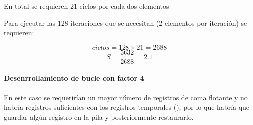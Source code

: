 En total se requieren 21 ciclos por cada dos elementos

Para ejecutar las 128 iteraciones que se necesitan (2 elementos por iteración)
se requieren:

\[
ciclos = 128 \times 21 = 2688
\]
\[
S = \frac{5632}{2688} = 2.1
\]

\paragraph{Desenrrollamiento de bucle con factor 4}

En este caso se requerirían un mayor número de registros de coma flotante y
no habría registros suficientes con los registros temporales (),
por lo que habría que guardar algún registro en la pila y posteriormente
restaurarlo.
